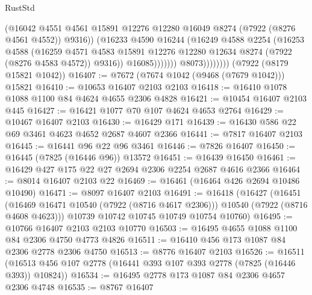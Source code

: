 \begin{lexlean}{RustStd}
\begin{coremodule}
                                (@16042
                                  @4551
                                  @4561
                                  @15891
                                  @12276
                                  @12280
                                  @16049
                                  @8274
                                  (@7922 (@8276 @4561 @4552))
                                  @9316))
                              (@16233
                                @4590
                                @16244
                                (@16249
                                  @4588
                                  @2254
                                  (@16253
                                    @4588
                                    (@16259
                                      @4571
                                      @4583
                                      @15891
                                      @12276
                                      @12280
                                      @12634
                                      @8274
                                      (@7922 (@8276 @4583 @4572))
                                      @9316))
                                  @16085)))))))
                    @8073))))))))
    (@7922 (@8179 @15821 @1042))
@16407 := @7672 (@7674 @1042 (@9468 (@7679 @1042))) @15821
@16410 := @10653 @16407 @2103 @2103
@16418 := @16410 @1078 @1088 @1100 @84 @4624 @4655 @2306 @4828
@16421 := @10454 @16407 @2103 @445
@16427 := @16421 @1077 @70 @107 @4624 @4653 @2764
@16429 := @10467 @16407 @2103
@16430 := @16429 @171
@16439 := @16430 @586 @22 @69 @3461 @4623 @4652 @2687 @4607 @2366
@16441 := @7817 @16407 @2103
@16445 := @16441 @96 @22 @96 @3461
@16446 := @7826 @16407
@16450 := @16445 (@7825 (@16446 @96)) @13572
@16451 := @16439 @16450
@16461 := @16429 @427 @175 @22 @27 @2694 @2306 @2254 @2687 @4616 @2366
@16464 := @8014 @16407 @2103 @22
@16469 := @16461 (@16464 @426 @2694 @10486 @10490)
@16471 := @8097 @16407 @2103
@16491 := @16418
    (@16427
      (@16451 (@16469 @16471 @10540 (@7922 (@8716 @4617 @2306))) @10540 (@7922 (@8716 @4608 @4623)))
      @10739
      @10742
      @10745
      @10749
      @10754
      @10760)
@16495 := @10766 @16407 @2103 @2103 @10770
@16503 := @16495 @4655 @1088 @1100 @84 @2306 @4750 @4773 @4826
@16511 := @16410 @456 @173 @1087 @84 @2306 @2778 @2306 @4750
@16513 := @8776 @16407 @2103
@16526 := @16511 (@16513 @456 @107 @2778 (@16441 @393 @107 @393 @2778 (@7825 (@16446 @393)) @10824))
@16534 := @16495 @2778 @173 @1087 @84 @2306 @4657 @2306 @4748
@16535 := @8767 @16407

\end{coremodule}
\end{lexlean}
